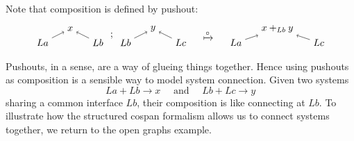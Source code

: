 \documentclass{amsart}
\renewcommand{\t}[1]{\text{#1}}
\newcommand{\csp}[3]{#1 + #3 \to #2}
\theoremstyle{remark}
\theoremstyle{definition}
\begin{document}
Note that composition is defined by pushout:
%
\[
  \begin{tikzpicture}
    \begin{scope}
    \node (1) at (0,0) {\( La \)};
    \node (2) at (1,0.5) {\( x \)};
    \node (3) at (2,0) {\( Lb \)};
    \node (4) at (3,0) {\( Lb \)};
    \node (5) at (4,0.5) {\( y \)};
    \node (6) at (5,0) {\( Lc \)};
    \node (7) at (2.5,0.25) {\( ; \)};
    \draw [->] (1) to node [] {\scriptsize{\(  \)}} (2);
    \draw [->] (3) to node [] {\scriptsize{\(  \)}} (2);
    \draw [->] (4) to node [] {\scriptsize{\(  \)}} (5);
    \draw [->] (6) to node [] {\scriptsize{\(  \)}} (5);
    \end{scope}
    \begin{scope}[shift={(6,0)}]
    \node (1) at (0,0.25) {\( \xmapsto{\circ} \)};
    \end{scope}
    \begin{scope}[shift={(7,0)}]
    \node (1) at (0,0) {\( La \)};
    \node (2) at (1.5,0.5) {\( x +_{Lb} y \)};
    \node (3) at (3,0) {\( Lc \)};
     \draw [->] (1) to node [] {\scriptsize{\(  \)}} (2);
    \draw [->] (3) to node [] {\scriptsize{\(  \)}} (2); 
    \end{scope}
  \end{tikzpicture}
\]
% 

Pushouts, in a sense, are a way of glueing things
together. Hence using pushouts as composition is a sensible way to model
system connection. Given two systems
%
\[
  \csp{La}{x}{Lb}
  \quad
  \t{ and }
  \quad
  \csp{Lb}{y}{Lc}
\]
% 
sharing a common interface $ Lb $, their composition is like
connecting at $ Lb $. To illustrate how the structured cospan
formalism allows us to connect systems together, we return to the open
graphs example.
\end{document}
